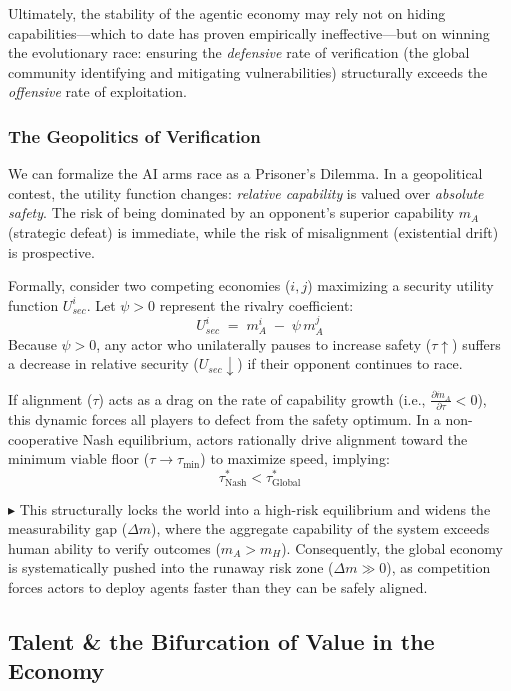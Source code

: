\documentclass[12pt, letter]{article}
\begin{document}
Ultimately, the stability of the agentic economy may rely not on hiding capabilities---which to date has proven empirically ineffective---but on winning the evolutionary race: ensuring the \emph{defensive} rate of verification (the global community identifying and mitigating vulnerabilities) structurally exceeds the \emph{offensive} rate of exploitation.



\subsubsection{The Geopolitics of Verification}

We can formalize the AI arms race as a Prisoner's Dilemma. In a geopolitical contest, the utility function changes: \emph{relative capability} is valued over \emph{absolute safety}. The risk of being dominated by an opponent's superior capability $m_A$ (strategic defeat) is immediate, while the risk of misalignment (existential drift) is prospective. 

Formally, consider two competing economies ($i,j$) maximizing a security utility function $U_{sec}^{i}$. Let $\psi > 0$ represent the rivalry coefficient:
\[
U_{sec}^{i} \;=\; m_A^i \;-\; \psi\,m_A^j
\]
Because $\psi > 0$, any actor who unilaterally pauses to increase safety ($\tau \uparrow$) suffers a decrease in relative security ($U_{sec} \downarrow$) if their opponent continues to race. 

If alignment ($\tau$) acts as a drag on the rate of capability growth (i.e., $\frac{\partial \dot m_A}{\partial \tau}<0$), this dynamic forces all players to defect from the safety optimum. In a non-cooperative Nash equilibrium, actors rationally drive alignment toward the minimum viable floor ($\tau \to \tau_{\min}$) to maximize speed, implying:
\[
\tau^{\ast}_{\mathrm{Nash}} < \tau^{\ast}_{\mathrm{Global}}
\]

$\blacktriangleright$ This structurally locks the world into a high-risk equilibrium and widens the measurability gap ($\Delta m$), where the aggregate capability of the system exceeds human ability to verify outcomes ($m_A > m_H$). Consequently, the global economy is systematically pushed into the runaway risk zone ($\Delta m \gg 0$), as competition forces actors to deploy agents faster than they can be safely aligned.


\subsection{Talent \& the Bifurcation of Value in the Economy}
\label{subsec:bifurcation}
\end{document}
